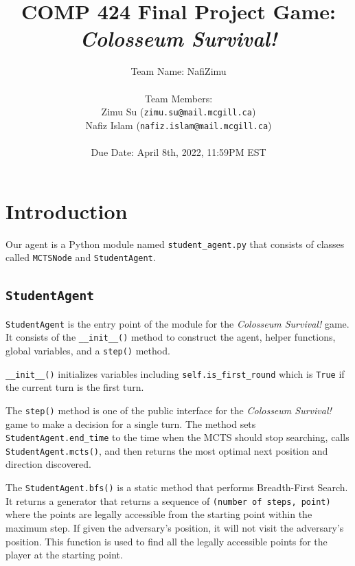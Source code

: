 \documentclass[twoside,11pt]{article}
\begin{document}
\title{COMP 424 Final Project Game: \textit{Colosseum Survival!}}
\author{Team Name: NafiZimu\\\\Team Members: \\Zimu Su (\texttt{zimu.su@mail.mcgill.ca}) \\Nafiz Islam (\texttt{nafiz.islam@mail.mcgill.ca})\\\\Due Date: April 8th, 2022, 11:59PM EST}

\maketitle

\section{Introduction}

Our agent is a Python module named \texttt{student\_agent.py} that consists of classes called \texttt{MCTSNode} and \texttt{StudentAgent}.

\subsection{\texttt{StudentAgent}}

\texttt{StudentAgent} is the entry point of the module for the \textit{Colosseum Survival!} game.
It consists of the \texttt{\_\_init\_\_()} method to construct the agent, helper functions, global variables, and a \texttt{step()} method.

\texttt{\_\_init\_\_()} initializes variables including \texttt{self.is\_first\_round} which is \texttt{True} if the current turn is the first turn.

The \texttt{step()} method is one of the public interface for the \textit{Colosseum Survival!} game to make a decision for a single turn.
The method sets \texttt{StudentAgent.end\_time} to the time when the MCTS should stop searching, calls \texttt{StudentAgent.mcts()}, and then returns the most optimal next position and direction discovered.

The \texttt{StudentAgent.bfs()} is a static method that performs Breadth-First Search.
It returns a generator that returns a sequence of \texttt{(number of steps, point)} where the points are legally accessible from the starting point within the maximum step.
If given the adversary's position, it will not visit the adversary's position.
This function is used to find all the legally accessible points for the player at the starting point.
\end{document}
